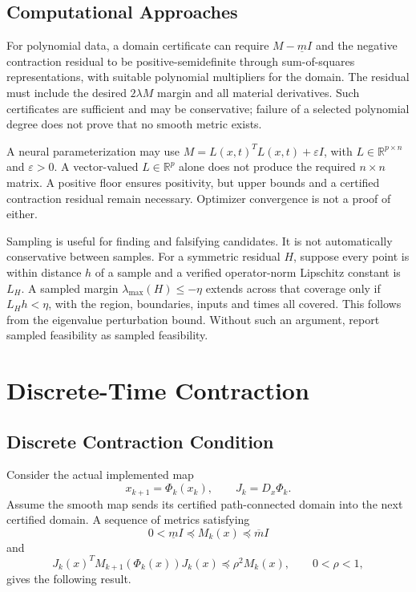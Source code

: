 \subsection{Computational Approaches}

For polynomial data, a domain certificate can require $M-\underline mI$ and the negative contraction residual to be positive-semidefinite through sum-of-squares representations, with suitable polynomial multipliers for the domain. The residual must include the desired $2\lambda M$ margin and all material derivatives. Such certificates are sufficient and may be conservative; failure of a selected polynomial degree does not prove that no smooth metric exists.

A neural parameterization may use $M=L(x,t)^TL(x,t)+\varepsilon I$, with $L\in\mathbb R^{p\times n}$ and $\varepsilon>0$. A vector-valued $L\in\mathbb R^p$ alone does not produce the required $n\times n$ matrix. A positive floor ensures positivity, but upper bounds and a certified contraction residual remain necessary. Optimizer convergence is not a proof of either.

Sampling is useful for finding and falsifying candidates. It is not automatically conservative between samples. For a symmetric residual $H$, suppose every point is within distance $h$ of a sample and a verified operator-norm Lipschitz constant is $L_H$. A sampled margin $\lambda_{\max}(H)\leq-\eta$ extends across that coverage only if $L_Hh<\eta$, with the region, boundaries, inputs and times all covered. This follows from the eigenvalue perturbation bound. Without such an argument, report sampled feasibility as sampled feasibility.

\section{Discrete-Time Contraction}
\label{sec:ch4:discrete}

\subsection{Discrete Contraction Condition}

Consider the actual implemented map
\begin{equation}
x_{k+1}=\Phi_k(x_k),\qquad J_k=D_x\Phi_k.
\label{eq:ch4:discrete-system}
\end{equation}
Assume the smooth map sends its certified path-connected domain into the next certified domain. A sequence of metrics satisfying
\begin{equation}
0<\underline mI\preceq M_k(x)\preceq\overline mI
\label{eq:ch4:discrete-metric-bounds}
\end{equation}
and
\begin{equation}
J_k(x)^TM_{k+1}(\Phi_k(x))J_k(x)\preceq\rho^2M_k(x),\qquad0<\rho<1,
\label{eq:ch4:discrete-contraction-condition}
\end{equation}
gives the following result.

